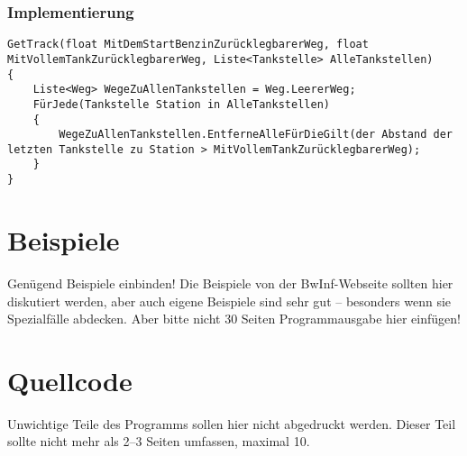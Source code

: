 \documentclass[a4paper,10pt,ngerman]{scrartcl}
\begin{document}
\subsubsection{Implementierung}
\begin{lstlisting}
GetTrack(float MitDemStartBenzinZurücklegbarerWeg, float MitVollemTankZurücklegbarerWeg, Liste<Tankstelle> AlleTankstellen)
{
	Liste<Weg> WegeZuAllenTankstellen = Weg.LeererWeg;
	FürJede(Tankstelle Station in AlleTankstellen)
	{
		WegeZuAllenTankstellen.EntferneAlleFürDieGilt(der Abstand der letzten Tankstelle zu Station > MitVollemTankZurücklegbarerWeg);
	}
}
\end{lstlisting}
\section{Beispiele}

Genügend Beispiele einbinden! Die Beispiele von der BwInf-Webseite sollten hier diskutiert werden, aber auch eigene Beispiele sind sehr gut – besonders wenn sie Spezialfälle abdecken. Aber bitte nicht 30 Seiten Programmausgabe hier einfügen!

\section{Quellcode}
Unwichtige Teile des Programms sollen hier nicht abgedruckt werden. Dieser Teil sollte nicht mehr als 2–3 Seiten umfassen, maximal 10.
\end{document}
